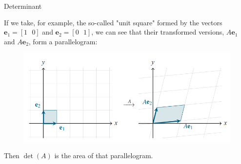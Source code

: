 \documentclass{beamer}
\newcommand{\ve}{\mathbf{e}}
\begin{document}
      


\begin{frame}{Determinant}

 If we take, for example, the so-called "unit square" formed by the vectors $\ve_1=[1\,\,\,\,0]$ and $\ve_2=[0\,\,\,\,1]$, we can see that their transformed versions, $A\ve_1$ and $A\ve_2$, form a parallelogram:

\begin{figure}
    \centering
    \includegraphics[width=0.75\linewidth]{viz det.png}
    
    
\end{figure}

\pause Then $\det(A)$ is  the area of that parallelogram.
\end{frame}
\end{document}

